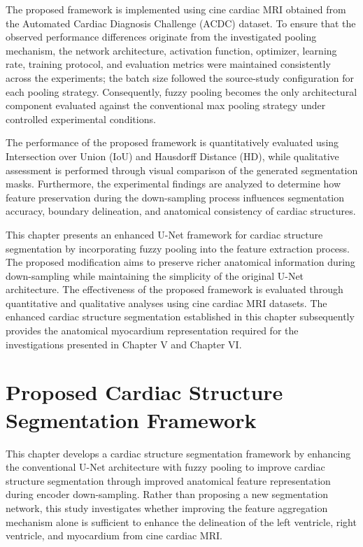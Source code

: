 The proposed framework is implemented using cine cardiac MRI obtained from the Automated Cardiac Diagnosis Challenge (ACDC) dataset. To ensure that the observed performance differences originate from the investigated pooling mechanism, the network architecture, activation function, optimizer, learning rate, training protocol, and evaluation metrics were maintained consistently across the experiments; the batch size followed the source-study configuration for each pooling strategy. Consequently, fuzzy pooling becomes the only architectural component evaluated against the conventional max pooling strategy under controlled experimental conditions.

The performance of the proposed framework is quantitatively evaluated using Intersection over Union (IoU) and Hausdorff Distance (HD), while qualitative assessment is performed through visual comparison of the generated segmentation masks. Furthermore, the experimental findings are analyzed to determine how feature preservation during the down-sampling process influences segmentation accuracy, boundary delineation, and anatomical consistency of cardiac structures.

This chapter presents an enhanced U-Net framework for cardiac structure segmentation by incorporating fuzzy pooling into the feature extraction process. The proposed modification aims to preserve richer anatomical information during down-sampling while maintaining the simplicity of the original U-Net architecture. The effectiveness of the proposed framework is evaluated through quantitative and qualitative analyses using cine cardiac MRI datasets. The enhanced cardiac structure segmentation established in this chapter subsequently provides the anatomical myocardium representation required for the investigations presented in Chapter V and Chapter VI.

\section{Proposed Cardiac Structure Segmentation Framework}
\label{sec:ch4-framework}

This chapter develops a cardiac structure segmentation framework by enhancing the conventional U-Net architecture with fuzzy pooling to improve cardiac structure segmentation through improved anatomical feature representation during encoder down-sampling. Rather than proposing a new segmentation network, this study investigates whether improving the feature aggregation mechanism alone is sufficient to enhance the delineation of the left ventricle, right ventricle, and myocardium from cine cardiac MRI.

